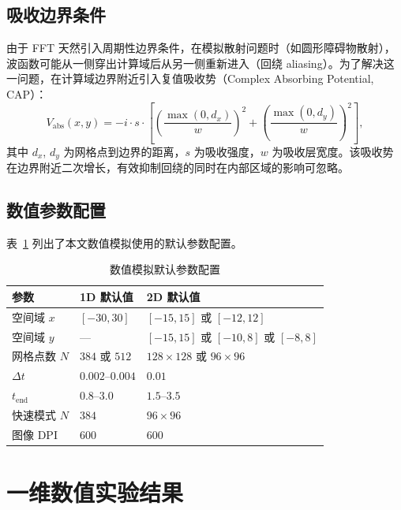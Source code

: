 \documentclass[12pt,a4paper]{article}
\begin{document}
\subsection{吸收边界条件}

由于 FFT 天然引入周期性边界条件，在模拟散射问题时（如圆形障碍物散射），波函数可能从一侧穿出计算域后从另一侧重新进入（回绕 aliasing）。为了解决这一问题，在计算域边界附近引入复值吸收势（Complex Absorbing Potential, CAP）：
\begin{equation}
    V_{\text{abs}}(x,y) = -i \cdot s \cdot
    \left[\left(\frac{\max(0, d_x)}{w}\right)^2
    + \left(\frac{\max(0, d_y)}{w}\right)^2\right],
\end{equation}
其中 $d_x$, $d_y$ 为网格点到边界的距离，$s$ 为吸收强度，$w$ 为吸收层宽度。该吸收势在边界附近二次增长，有效抑制回绕的同时在内部区域的影响可忽略。

\subsection{数值参数配置}

表~\ref{tab:config} 列出了本文数值模拟使用的默认参数配置。

\begin{table}[H]
\centering
\caption{数值模拟默认参数配置}
\label{tab:config}
\begin{tabular}{@{}lll@{}}
\toprule
\textbf{参数} & \textbf{1D 默认值} & \textbf{2D 默认值} \\
\midrule
空间域 $x$           & $[-30, 30]$          & $[-15, 15]$ 或 $[-12, 12]$ \\
空间域 $y$           & ---                  & $[-15, 15]$ 或 $[-10, 8]$ 或 $[-8, 8]$ \\
网格点数 $N$         & $384$ 或 $512$        & $128\times128$ 或 $96\times96$ \\
$\Delta t$          & $0.002$--$0.004$     & $0.01$ \\
$t_{\text{end}}$    & $0.8$--$3.0$         & $1.5$--$3.5$ \\
快速模式 $N$         & $384$                & $96\times96$ \\
图像 DPI            & $600$                & $600$ \\
\bottomrule
\end{tabular}
\end{table}

\section{一维数值实验结果}
\end{document}
